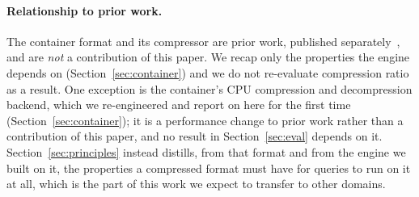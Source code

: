 \paragraph{Relationship to prior work.}
The container format and its compressor are prior work, published
separately~\cite{gfaz2026}, and are \emph{not} a contribution of this paper. We
recap only the properties the engine depends on (Section~\ref{sec:container}) and
we do not re-evaluate compression ratio as a result. One exception is the
container's CPU compression and decompression backend, which we re-engineered and
report on here for the first time (Section~\ref{sec:container}); it is a
performance change to prior work rather than a contribution of this paper, and no
result in Section~\ref{sec:eval} depends on it.
Section~\ref{sec:principles} instead distills, from that format and from the
engine we built on it, the properties a compressed format must have for queries to
run on it at all, which is the part of this work we expect to transfer to other
domains.

